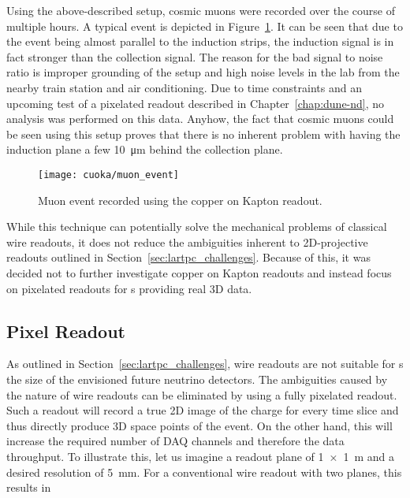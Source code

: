 Using the above-described setup, cosmic muons were recorded over the course of multiple hours.
A typical event is depicted in Figure~\ref{fig:cuoka_event}.
It can be seen that due to the event being almost parallel to the induction strips, the induction signal is in fact stronger than the collection signal.
The reason for the bad signal to noise ratio is improper grounding of the setup and high noise levels in the lab from the nearby train station and air conditioning.
Due to time constraints and an upcoming test of a pixelated readout described in Chapter~\ref{chap:dune-nd}, no analysis was performed on this data.
Anyhow, the fact that cosmic muons could be seen using this setup proves that there is no inherent problem with having the induction plane a few \SI{10}{\micro\metre} behind the collection plane.

\begin{figure}[htb]
	\centering
	\texttt{[image: cuoka/muon\_event]}
	\caption{Muon event recorded using the copper on Kapton readout.}
	\label{fig:cuoka_event}
\end{figure}

While this technique can potentially solve the mechanical problems of classical wire readouts, it does not reduce the ambiguities inherent to 2D-projective readouts outlined in Section~\ref{sec:lartpc_challenges}.
Because of this, it was decided not to further investigate copper on Kapton readouts and instead focus on pixelated readouts for \lartpc{}s providing real 3D data.

\afterpage{\clearpage}


\subsection{Pixel Readout}
\label{sec:studies_charge-ro_pixel}

As outlined in Section~\ref{sec:lartpc_challenges}, wire readouts are not suitable for \lartpc{}s the size of the envisioned future neutrino detectors.
The ambiguities caused by the nature of wire readouts can be eliminated by using a fully pixelated readout.
Such a readout will record a true 2D image of the charge for every time slice and thus directly produce 3D space points of the event.
On the other hand, this will increase the required number of DAQ channels and therefore the data throughput.
To illustrate this, let us imagine a readout plane of \SI{1 x 1}{\metre} and a desired resolution of \SI{5}{\milli\metre}.
For a conventional wire readout with two planes, this results in


